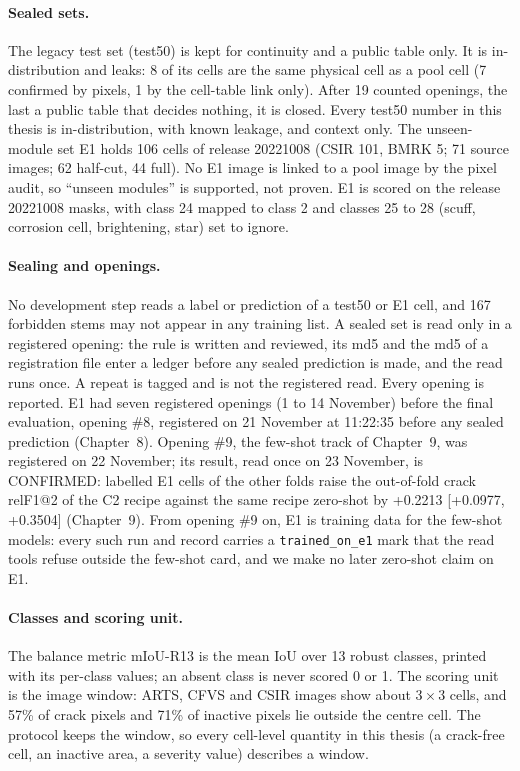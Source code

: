\paragraph{Sealed sets.} The legacy test set (test50) is kept for continuity and a public table only. It is in-distribution and leaks:
8 of its cells are the same physical cell as a pool cell (7 confirmed by pixels, 1 by the cell-table link only). After 19 counted
openings, the last a public table that decides nothing, it is closed. Every test50 number in this thesis is in-distribution, with known leakage, and context only. The unseen-module set E1 holds 106 cells
of release 20221008 (CSIR 101, BMRK 5; 71 source images; 62 half-cut, 44 full). No E1 image is linked to a pool image by the pixel
audit, so ``unseen modules'' is supported, not proven. E1 is scored on the release 20221008 masks, with class 24 mapped to class 2 and
classes 25 to 28 (scuff, corrosion cell, brightening, star) set to ignore.

\paragraph{Sealing and openings.} No development step reads a label or prediction of a test50 or E1 cell, and 167 forbidden stems may
not appear in any training list. A sealed set is read only in a registered opening: the rule is written and reviewed, its md5 and the
md5 of a registration file enter a ledger before any sealed prediction is made, and the read runs once. A repeat is tagged and is not
the registered read. Every opening is reported. E1 had seven registered openings (1 to 14 November) before the final evaluation, opening \#8, registered on 21 November at 11:22:35 before
any sealed prediction (Chapter~8). Opening \#9, the few-shot track of Chapter~9, was registered on 22 November; its result, read once on 23
November, is CONFIRMED: labelled E1 cells of the other folds raise the out-of-fold crack relF1@2 of the C2 recipe against the same
recipe zero-shot by +0.2213 [+0.0977, +0.3504] (Chapter~9). From opening \#9 on, E1 is training data for the few-shot models: every such run and record carries a
\texttt{trained\_on\_e1} mark that the read tools refuse outside the few-shot card, and we make no later zero-shot claim on E1.

\paragraph{Classes and scoring unit.} The balance metric mIoU-R13 is the mean IoU over 13 robust classes, printed with its
per-class values; an absent class is never scored 0 or 1. The scoring unit is the image window: ARTS, CFVS and CSIR images show about
$3\times3$ cells, and 57\% of crack pixels and 71\% of inactive pixels lie outside the centre cell. The protocol keeps the window, so
every cell-level quantity in this thesis (a crack-free cell, an inactive area, a severity value) describes a window.

